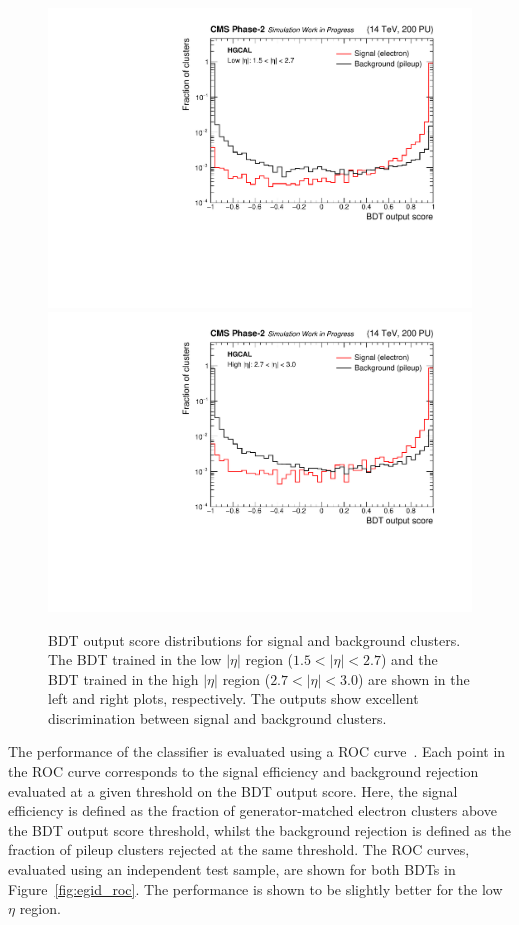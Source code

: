 \begin{figure}[htb!]
  \centering
  \includegraphics[width=.49\textwidth]{Figures/cms/egid/cl3d_bdt_electron_200PU_vs_neutrino_200PU_full_lo.pdf}
  \includegraphics[width=.49\textwidth]{Figures/cms/egid/cl3d_bdt_electron_200PU_vs_neutrino_200PU_full_hi.pdf}
  \caption[$e/\gamma$ identification output score distributions]
  {
    BDT output score distributions for signal and background clusters. The BDT trained in the low $|\eta|$ region ($1.5<|\eta|<2.7$) and the BDT trained in the high $|\eta|$ region ($2.7<|\eta|<3.0$) are shown in the left and right plots, respectively. The outputs show excellent discrimination between signal and background clusters.
  }
  \label{fig:egid_output}
\end{figure}

The performance of the classifier is evaluated using a ROC curve~\cite{}. Each point in the ROC curve corresponds to the signal efficiency and background rejection evaluated at a given threshold on the BDT output score. Here, the signal efficiency is defined as the fraction of generator-matched electron clusters above the BDT output score threshold, whilst the background rejection is defined as the fraction of pileup clusters rejected at the same threshold. The ROC curves, evaluated using an independent test sample, are shown for both BDTs in Figure~\ref{fig:egid_roc}. The performance is shown to be slightly better for the low $\eta$ region. 

